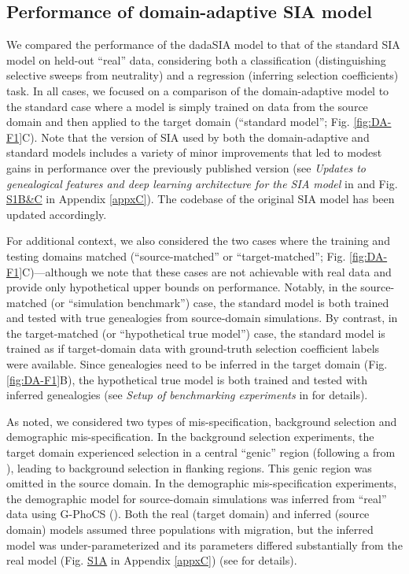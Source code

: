 \subsection{Performance of domain-adaptive \ac{SIA} model}
We compared the performance of the \acf{dadaSIA} model to that of the standard \ac{SIA} model on held-out “real” data, considering both a classification (distinguishing selective sweeps from neutrality) and a regression (inferring selection coefficients) task. In all cases, we focused on a comparison of the domain-adaptive model to the standard case where a model is simply trained on data from the source domain and then applied to the target domain (“standard model”; Fig. \ref{fig:DA-F1}C). Note that the version of \ac{SIA} used by both the domain-adaptive and standard models includes a variety of minor improvements that led to modest gains in performance over the previously published version (see \textit{Updates to genealogical features and deep learning architecture for the \ac{SIA} model} in  and Fig. \href{https://journals.plos.org/plosgenetics/article?id=10.1371/journal.pgen.1011032#sec018}{S1B\&C} in Appendix \ref{appxC}). The codebase of the original \ac{SIA} model has been updated accordingly.

For additional context, we also considered the two cases where the training and testing domains matched (“source-matched” or “target-matched”; Fig. \ref{fig:DA-F1}C)—although we note that these cases are not achievable with real data and provide only hypothetical upper bounds on performance. Notably, in the source-matched (or “simulation benchmark”) case, the standard model is both trained and tested with true genealogies from source-domain simulations. By contrast, in the target-matched (or “hypothetical true model”) case, the standard model is trained as if target-domain data with ground-truth selection coefficient labels were available. Since genealogies need to be inferred in the target domain (Fig. \ref{fig:DA-F1}B), the hypothetical true model is both trained and tested with inferred genealogies (see \textit{Setup of benchmarking experiments} in  for details).

As noted, we considered two types of mis-specification, background selection and demographic mis-specification. In the background selection experiments, the target domain experienced selection in a central “genic” region (following a  from \cite{boyko_assessing_2008}), leading to background selection in flanking regions. This genic region was omitted in the source domain. In the demographic mis-specification experiments, the demographic model for source-domain simulations was inferred from “real” data using G-PhoCS (\cite{gronau_bayesian_2011}). Both the real (target domain) and inferred (source domain) models assumed three populations with migration, but the inferred model was under-parameterized and its parameters differed substantially from the real model (Fig. \href{https://journals.plos.org/plosgenetics/article?id=10.1371/journal.pgen.1011032#sec018}{S1A} in Appendix \ref{appxC}) (see  for details).

